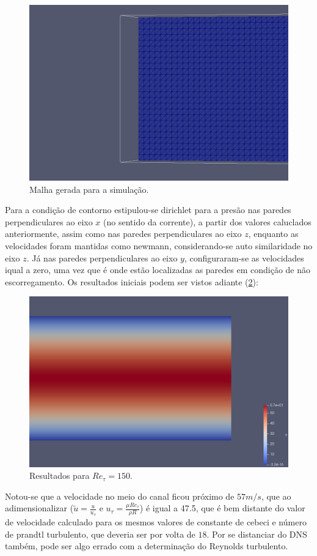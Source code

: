 \begin{figure}[!h]
  \centering
  \includegraphics[angle=0, scale=0.25]{cap_fundamentacao/domain_mesh.jpeg}
  \caption{Malha gerada para a simulação.}
  \label{fig:malha}
\end{figure}

Para a condição de contorno estipulou-se dirichlet para a presão nas paredes perpendiculares ao eixo $x$ (no sentido da corrente), a partir dos valores caluclados anteriormente, assim como nas paredes perpendiculares ao eixo $z$, enquanto as velocidades foram mantidas como newmann, considerando-se auto similaridade no eixo $z$. Já nas paredes perpendiculares ao eixo $y$, configuraram-se as velocidades iqual a zero, uma vez que é onde estão localizadas as paredes em condição de não escorregamento. Os resultados iniciais podem ser vistos adiante (\ref{fig:first_results}):

\begin{figure}[!h]
  \centering
  \includegraphics[angle=0, scale=0.25]{cap_fundamentacao/first_results.png}
  \caption{Resultados para $Re_\tau = 150$.}
  \label{fig:first_results}
\end{figure}

Notou-se que a velocidade no meio do canal ficou próximo de $57 m/s$, que ao adimensionalizar ($\tilde{u} = \frac{u}{u_\tau}$ e $u_\tau = \frac{\mu Re_\tau}{\rho R}$) é igual a 47.5, que é bem distante do valor de velocidade calculado para os mesmos valores de constante de cebeci e número de prandtl turbulento, que deveria ser por volta de $18$. Por se distanciar do DNS também, pode ser algo errado com a determinação do Reynolds turbulento.
